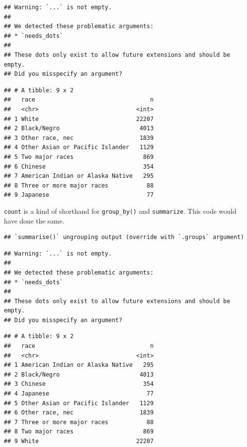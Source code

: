 \documentclass[
]{book}
\newenvironment{Shaded}{\begin{snugshade}}{\end{snugshade}}
\newcommand{\DataTypeTok}[1]{\textcolor[rgb]{0.13,0.29,0.53}{#1}}
\newcommand{\KeywordTok}[1]{\textcolor[rgb]{0.13,0.29,0.53}{\textbf{#1}}}
\newcommand{\NormalTok}[1]{#1}
\newcommand{\OperatorTok}[1]{\textcolor[rgb]{0.81,0.36,0.00}{\textbf{#1}}}
\newcommand{\StringTok}[1]{\textcolor[rgb]{0.31,0.60,0.02}{#1}}
\theoremstyle{definition}
\theoremstyle{definition}
\theoremstyle{definition}
\theoremstyle{definition}
\theoremstyle{remark}
\begin{document}
\begin{verbatim}
## Warning: `...` is not empty.
## 
## We detected these problematic arguments:
## * `needs_dots`
## 
## These dots only exist to allow future extensions and should be empty.
## Did you misspecify an argument?
\end{verbatim}

\begin{verbatim}
## # A tibble: 9 x 2
##   race                                 n
##   <chr>                            <int>
## 1 White                            22207
## 2 Black/Negro                       4013
## 3 Other race, nec                   1839
## 4 Other Asian or Pacific Islander   1129
## 5 Two major races                    869
## 6 Chinese                            354
## 7 American Indian or Alaska Native   295
## 8 Three or more major races           88
## 9 Japanese                            77
\end{verbatim}

\texttt{count} is a kind of shorthand for \texttt{group\_by()} and \texttt{summarize}. This code would have done the same.

\begin{Shaded}
\end{Shaded}

\begin{verbatim}
## `summarise()` ungrouping output (override with `.groups` argument)
\end{verbatim}

\begin{verbatim}
## Warning: `...` is not empty.
## 
## We detected these problematic arguments:
## * `needs_dots`
## 
## These dots only exist to allow future extensions and should be empty.
## Did you misspecify an argument?
\end{verbatim}

\begin{verbatim}
## # A tibble: 9 x 2
##   race                                 n
##   <chr>                            <int>
## 1 American Indian or Alaska Native   295
## 2 Black/Negro                       4013
## 3 Chinese                            354
## 4 Japanese                            77
## 5 Other Asian or Pacific Islander   1129
## 6 Other race, nec                   1839
## 7 Three or more major races           88
## 8 Two major races                    869
## 9 White                            22207
\end{verbatim}
\end{document}
